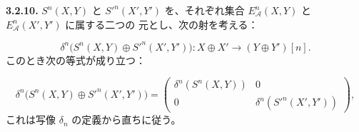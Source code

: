 \medskip\noindent\textbf{3.2.10.}\quad
$S^n(X,Y)$ と ${S'}^n(X',Y')$ を、それぞれ集合
$E_{\mathcal A}^{n}(X,Y)$ と $E_{\mathcal A}^{n}(X',Y')$ に属する二つの
元とし、次の射を考える：

\[
\delta^n\bigl(S^n(X,Y)\oplus {S'}^n(X',Y')\bigr)
\colon X\oplus X'\longrightarrow (Y\oplus Y')[n].
\]
このとき次の等式が成り立つ：

\begin{equation}
\delta^n\bigl(S^n(X,Y)\oplus {S'}^n(X',Y')\bigr)
=
\begin{pmatrix}
\delta^n(S^n(X,Y))&0\\
0&\delta^n({S'}^n(X',Y'))
\end{pmatrix},
\tag{3.2.10.1}
\end{equation}
これは写像 $\delta_n$ の定義から直ちに従う。
\endgroup
